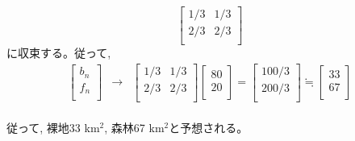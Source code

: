 \begin{enumerate}
\begin{equation}
\begin{bmatrix}
1/3 & 1/3\\
2/3 & 2/3\\
\end{bmatrix}
\end{equation}
に収束する。従って, \\
\begin{eqnarray*}
\begin{bmatrix}
b_n\\
f_n\\
\end{bmatrix}
&\rightarrow&
\begin{bmatrix}
1/3 & 1/3\\
2/3 & 2/3\\
\end{bmatrix}
\begin{bmatrix}
80\\
20\\
\end{bmatrix}
=\begin{bmatrix}
100/3\\
200/3\\
\end{bmatrix}
\fallingdotseq\begin{bmatrix}
33\\
67\\
\end{bmatrix}
\end{eqnarray*}
\\従って, 裸地33$\,\,$km$^2$, 森林67$\,\,$km$^2$と予想される。
\end{enumerate}


